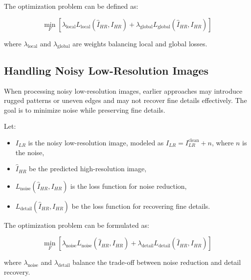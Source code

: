 \documentclass[twocolumn]{svjour3}          %
\begin{document}
The optimization problem can be defined as:

\[
\min_{F} \left[ \lambda_{\text{local}} L_{\text{local}}(\hat{I}_{HR}, I_{HR}) + \lambda_{\text{global}} L_{\text{global}}(\hat{I}_{HR}, I_{HR}) \right]
\]

where $\lambda_{\text{local}}$ and $\lambda_{\text{global}}$ are weights balancing local and global losses.

\subsection{Handling Noisy Low-Resolution Images}

When processing noisy low-resolution images, earlier approaches may introduce rugged patterns or uneven edges and may not recover fine details effectively. The goal is to minimize noise while preserving fine details.

Let:
\begin{itemize}
    \item $I_{LR}$ is the noisy low-resolution image, modeled as $I_{LR} = I_{LR}^{\text{clean}} + n$, where $n$ is the noise,
    \item $\hat{I}_{HR}$ be the predicted high-resolution image,
    \item $L_{\text{noise}}(\hat{I}_{HR}, I_{HR})$ is the loss function for noise reduction,
    \item $L_{\text{detail}}(\hat{I}_{HR}, I_{HR})$ be the loss function for recovering fine details.
\end{itemize}

The optimization problem can be formulated as:

\[
\min_{F} \left[ \lambda_{\text{noise}} L_{\text{noise}}(\hat{I}_{HR}, I_{HR}) + \lambda_{\text{detail}} L_{\text{detail}}(\hat{I}_{HR}, I_{HR}) \right]
\]

where $\lambda_{\text{noise}}$ and $\lambda_{\text{detail}}$ balance the trade-off between noise reduction and detail recovery.
\end{document}

